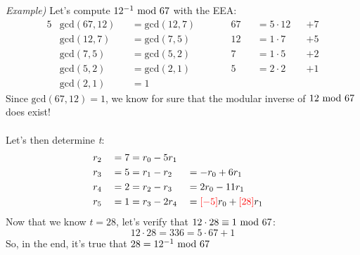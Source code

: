 \newpage
\hfill\break
\textit{Example)} Let's compute $12^{-1}\text{ mod }67$ with the EEA:
\begin{alignat*}{5}
    &\text{gcd}(67,12)&&=\text{gcd}(12,7)\qquad&&67&&=5\cdot12&&+7\\
    &\text{gcd}(12,7)&&=\text{gcd}(7,5)\qquad&&12&&=1\cdot7&&+5\\
    &\text{gcd}(7,5)&&=\text{gcd}(5,2)\qquad&&7&&=1\cdot5&&+2\\
    &\text{gcd}(5,2)&&=\text{gcd}(2,1)\qquad&&5&&=2\cdot2&&+1\\
    &\text{gcd}(2,1)&&=1
\end{alignat*}
Since $\text{gcd}(67,12)=1$, we know for sure that the modular inverse of $12\text{ mod }67$ does exist!\\\\Let's then determine \textit{t}:
\begin{alignat*}{3}
    &r_2&&=7=r_0-5r_1\\
    &r_3&&=5=r_1-r_2&&=-r_0+6r_1\\
    &r_4&&=2=r_2-r_3&&=2r_0-11r_1\\
    &r_5&&=1=r_3-2r_4&&=\textcolor{red}{[-5]}r_0+\textcolor{red}{[28]}r_1
\end{alignat*}
Now that we know $t=28$, let's verify that $12\cdot28\equiv1\text{ mod }67$:
$$12\cdot28=336=5\cdot67+1$$
So, in the end, it's true that $28=12^{-1}\text{ mod }67$ \checkmark

